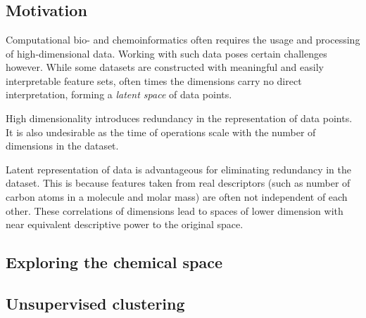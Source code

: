 \chapter{\bevezetes}

\section{Motivation}

Computational bio- and chemoinformatics often requires the usage and processing of high-dimensional data. Working with such data poses certain challenges however. While some datasets are constructed with meaningful and easily interpretable feature sets, often times the dimensions carry no direct interpretation, forming a \textit{latent space} of data points.

High dimensionality introduces redundancy in the representation of data points. It is also undesirable as the time of operations scale with the number of dimensions in the dataset.

Latent representation of data is advantageous for eliminating redundancy in the dataset. This is because features taken from real descriptors (such as number of carbon atoms in a molecule and molar mass) are often not independent of each other. These correlations of dimensions lead to spaces of lower dimension with near equivalent descriptive power to the original space. 

\section{Exploring the chemical space}



\section{Unsupervised clustering}